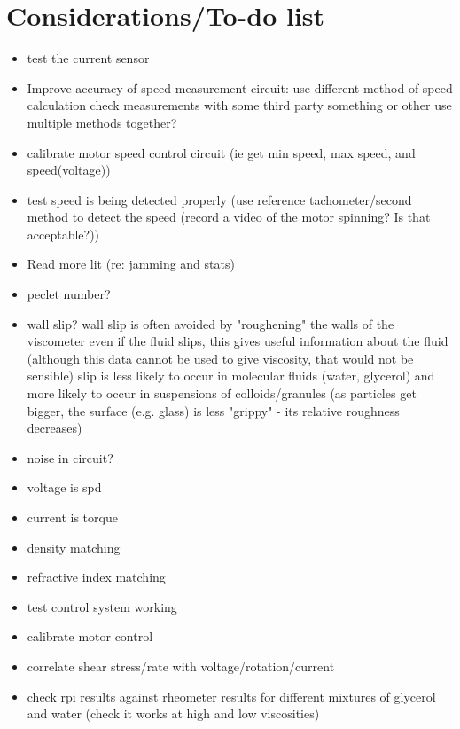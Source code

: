 \documentclass[a4]{report}
\begin{document}
	\section{Considerations/To-do list}
	\begin{itemize}
		\item test the current sensor
		\item Improve accuracy of speed measurement circuit:
		\subitem use different method of speed calculation
		\subitem check measurements with some third party something or other
		\subitem use multiple methods together?
		\item calibrate motor speed control circuit (ie get min speed, max speed, and speed(voltage))
		\item test speed is being detected properly (use reference tachometer/second method to detect the speed (record a video of the motor spinning? Is that acceptable?))
		\item Read more lit (re: jamming and stats)
		\item peclet number?
		\item wall slip?
		\subitem wall slip is often avoided by "roughening" the walls of the viscometer
		\subitem even if the fluid slips, this gives useful information about the fluid (although this data cannot be used to give viscosity, that would not be sensible)
		\subitem slip is less likely to occur in molecular fluids (water, glycerol) and more likely to occur in suspensions of colloids/granules (as particles get bigger, the surface (e.g. glass) is less "grippy" - its relative roughness decreases)
		\item noise in circuit?
		\item voltage is spd
		\item current is torque
		\item density matching
		\item refractive index matching
		\item test control system working
		\item calibrate motor control
		\item correlate shear stress/rate with voltage/rotation/current
		\item check rpi results against rheometer results for different mixtures of glycerol and water (check it works at high and low viscosities)
	\end{itemize}
	
\end{document}
